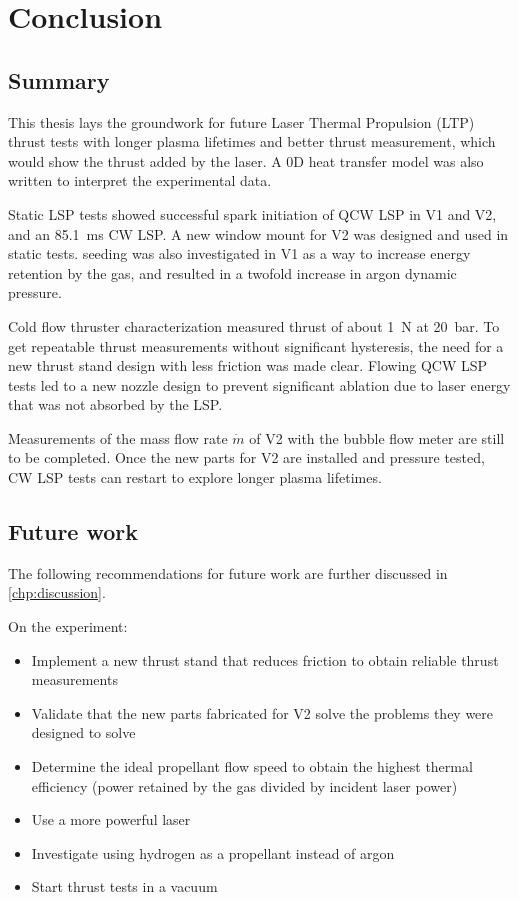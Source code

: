 \chapter{Conclusion}
    \section{Summary}

        This thesis lays the groundwork for future Laser Thermal Propulsion (LTP) thrust tests with longer plasma lifetimes and better thrust measurement, which would show the thrust added by the laser. A 0D heat transfer model was also written to interpret the experimental data.

        Static LSP tests showed successful spark initiation of QCW LSP in V1 and V2, and an \qty{85.1}{ms} CW LSP. A new window mount for V2 was designed and used in static tests.  seeding was also investigated in V1 as a way to increase energy retention by the gas, and resulted in a twofold increase in argon dynamic pressure. 

        Cold flow thruster characterization measured thrust of about \qty{1}{N} at \qty{20}{bar}. To get repeatable thrust measurements without significant hysteresis, the need for a new thrust stand design with less friction was made clear. Flowing QCW LSP tests led to a new nozzle design to prevent significant ablation due to laser energy that was not absorbed by the LSP. 
        
        Measurements of the mass flow rate $\dot m$ of V2 with the bubble flow meter are still to be completed. Once the new parts for V2 are installed and pressure tested, CW LSP tests can restart to explore longer plasma lifetimes.

    \section{Future work}

        The following recommendations for future work are further discussed in \autoref{chp:discussion}.
        
        On the experiment:
        \begin{itemize}
            \item Implement a new thrust stand that reduces friction to obtain reliable thrust measurements
            \item Validate that the new parts fabricated for V2 solve the problems they were designed to solve
            \item Determine the ideal propellant flow speed to obtain the highest thermal efficiency (power retained by the gas divided by incident laser power)
            \item Use a more powerful laser
            \item Investigate using hydrogen as a propellant instead of argon
            \item Start thrust tests in a vacuum
        \end{itemize}

